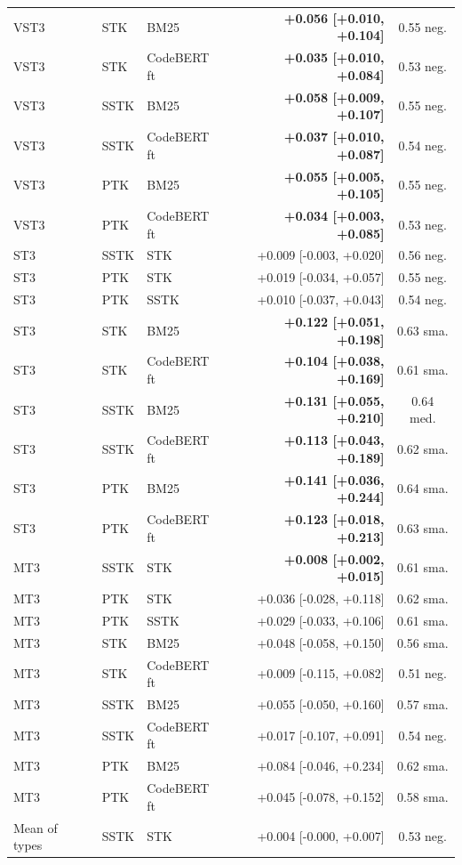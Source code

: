 \begin{table}[!htbp]
\begin{tabular}{lllrc}
VST3 & STK & BM25 & \textbf{+0.056 [+0.010, +0.104]} & 0.55 neg. \\
VST3 & STK & CodeBERT ft & \textbf{+0.035 [+0.010, +0.084]} & 0.53 neg. \\
VST3 & SSTK & BM25 & \textbf{+0.058 [+0.009, +0.107]} & 0.55 neg. \\
VST3 & SSTK & CodeBERT ft & \textbf{+0.037 [+0.010, +0.087]} & 0.54 neg. \\
VST3 & PTK & BM25 & \textbf{+0.055 [+0.005, +0.105]} & 0.55 neg. \\
VST3 & PTK & CodeBERT ft & \textbf{+0.034 [+0.003, +0.085]} & 0.53 neg. \\
\midrule
ST3 & SSTK & STK & +0.009 [-0.003, +0.020] & 0.56 neg. \\
ST3 & PTK & STK & +0.019 [-0.034, +0.057] & 0.55 neg. \\
ST3 & PTK & SSTK & +0.010 [-0.037, +0.043] & 0.54 neg. \\
ST3 & STK & BM25 & \textbf{+0.122 [+0.051, +0.198]} & 0.63 sma. \\
ST3 & STK & CodeBERT ft & \textbf{+0.104 [+0.038, +0.169]} & 0.61 sma. \\
ST3 & SSTK & BM25 & \textbf{+0.131 [+0.055, +0.210]} & 0.64 med. \\
ST3 & SSTK & CodeBERT ft & \textbf{+0.113 [+0.043, +0.189]} & 0.62 sma. \\
ST3 & PTK & BM25 & \textbf{+0.141 [+0.036, +0.244]} & 0.64 sma. \\
ST3 & PTK & CodeBERT ft & \textbf{+0.123 [+0.018, +0.213]} & 0.63 sma. \\
\midrule
MT3 & SSTK & STK & \textbf{+0.008 [+0.002, +0.015]} & 0.61 sma. \\
MT3 & PTK & STK & +0.036 [-0.028, +0.118] & 0.62 sma. \\
MT3 & PTK & SSTK & +0.029 [-0.033, +0.106] & 0.61 sma. \\
MT3 & STK & BM25 & +0.048 [-0.058, +0.150] & 0.56 sma. \\
MT3 & STK & CodeBERT ft & +0.009 [-0.115, +0.082] & 0.51 neg. \\
MT3 & SSTK & BM25 & +0.055 [-0.050, +0.160] & 0.57 sma. \\
MT3 & SSTK & CodeBERT ft & +0.017 [-0.107, +0.091] & 0.54 neg. \\
MT3 & PTK & BM25 & +0.084 [-0.046, +0.234] & 0.62 sma. \\
MT3 & PTK & CodeBERT ft & +0.045 [-0.078, +0.152] & 0.58 sma. \\
\midrule
Mean of types & SSTK & STK & +0.004 [-0.000, +0.007] & 0.53 neg. \\

\end{tabular}
\end{table}

